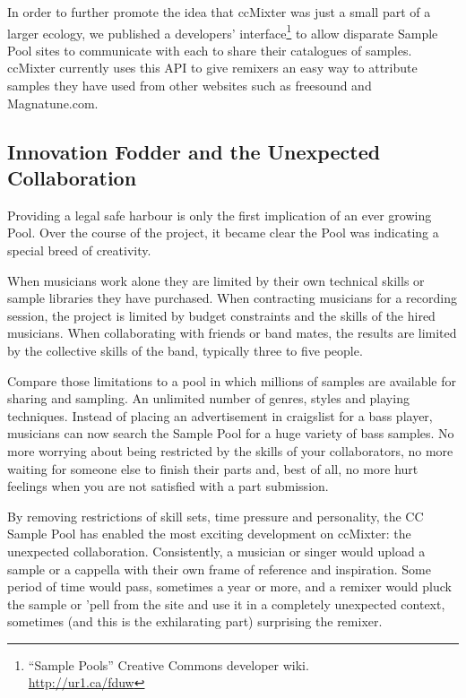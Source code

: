 In order to further promote the idea that ccMixter was just a small part of a
larger ecology, we published a developers' interface\footnote{``Sample Pools''
Creative Commons developer wiki.\\
\url{http://ur1.ca/fduw}} to allow
disparate Sample Pool sites to communicate with each to share their catalogues
of samples. ccMixter currently uses this API to give remixers an easy way to
attribute samples they have used from other websites such as freesound and
Magnatune.com.


\subsection{Innovation Fodder and the Unexpected Collaboration}
\label{ss:unexpected_collaboration:sample_pool:innovation_fodder}

Providing a legal safe harbour is only the f\hbox{}irst implication of an ever growing
Pool. Over the course of the project, it became clear the Pool was indicating a
special breed of creativity.

When musicians work alone they are limited by their own technical skills or
sample libraries they have purchased. When contracting musicians for a recording
session, the project is limited by budget constraints and the skills of the
hired musicians. When collaborating with friends or band mates, the results are
limited by the collective skills of the band, typically three to f\hbox{}ive people.

Compare those limitations to a pool in which millions of samples are available
for sharing and sampling. An unlimited number of genres, styles and playing
techniques. Instead of placing an advertisement in craigslist for a bass player,
musicians can now search the Sample Pool for a huge variety of bass samples. No
more worrying about being restricted by the skills of your collaborators, no
more waiting for someone else to f\hbox{}inish their parts and, best of all, no more
hurt feelings when you are not satisf\hbox{}ied with a part submission. 

By removing restrictions of skill sets, time pressure and personality, the CC
Sample Pool has enabled the most exciting development on ccMixter: the
unexpected collaboration. Consistently, a musician or singer would upload a
sample or a cappella with their own frame of reference and inspiration.
Some period of time would pass, sometimes a year or more, and a remixer would
pluck the sample or 'pell from the site and use it in a completely unexpected
context, sometimes (and this is the exhilarating part) surprising the remixer.

